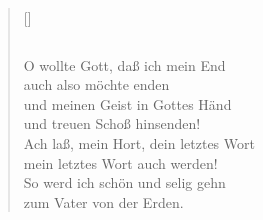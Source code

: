\begin{center}
\settowidth{\versewidth}{Der, vor dem die Welt erschrickt,}
\begin{verse}[\versewidth]
\begin{verbatim}

\end{verbatim}

 O wollte Gott, daß ich mein End\\
auch also möchte enden\\
und meinen Geist in Gottes Händ\\
und treuen Schoß hinsenden!\\
Ach laß, mein Hort, dein letztes Wort\\
mein letztes Wort auch werden!\\
So werd ich schön und selig gehn\\
zum Vater von der Erden.
  
\end{verse}
\end{center}




